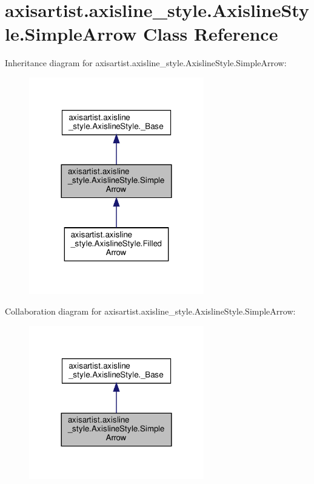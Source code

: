 \hypertarget{classaxisartist_1_1axisline__style_1_1AxislineStyle_1_1SimpleArrow}{}\section{axisartist.\+axisline\+\_\+style.\+Axisline\+Style.\+Simple\+Arrow Class Reference}
\label{classaxisartist_1_1axisline__style_1_1AxislineStyle_1_1SimpleArrow}


Inheritance diagram for axisartist.\+axisline\+\_\+style.\+Axisline\+Style.\+Simple\+Arrow\+:
\nopagebreak
\begin{figure}[H]
\begin{center}
\leavevmode
\includegraphics[width=216pt]{classaxisartist_1_1axisline__style_1_1AxislineStyle_1_1SimpleArrow__inherit__graph}
\end{center}
\end{figure}


Collaboration diagram for axisartist.\+axisline\+\_\+style.\+Axisline\+Style.\+Simple\+Arrow\+:
\nopagebreak
\begin{figure}[H]
\begin{center}
\leavevmode
\includegraphics[width=216pt]{classaxisartist_1_1axisline__style_1_1AxislineStyle_1_1SimpleArrow__coll__graph}
\end{center}
\end{figure}
